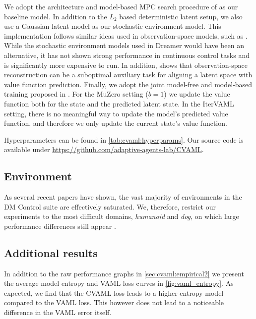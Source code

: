 We adopt the architecture and model-based MPC search procedure of \textcite{hansen2022temporal} as our baseline model.
In addition to the $L_2$ based deterministic latent setup, we also use a Gaussian latent model as our stochastic environment model.
This implementation follows similar ideas used in observation-space models, such as \textcite{pets,janner2019mbpo}.
While the stochastic environment models used in Dreamer \parencite{hafner2021mastering} would have been an alternative, it has not shown strong performance in continuous control tasks and is significantly more expensive to run.
In addition, \textcite{voelcker2024when} shows that observation-space reconstruction can be a suboptimal auxiliary task for aligning a latent space with value function prediction.
Finally, we adopt the joint model-free and model-based training proposed in \textcite{voelcker2025mad}.
For the MuZero setting ($b=1$) we update the value function both for the state and the predicted latent state.
In the IterVAML setting, there is no meaningful way to update the model's predicted value function, and therefore we only update the current state's value function.

Hyperparameters can be found in \autoref{tab:cvaml:hyperparams}.
Our source code is available under \url{https://github.com/adaptive-agents-lab/CVAML}.

\subsection{Environment}
\label{app:stoch_env}
As several recent papers have shown, the vast majority of environments in the DM Control suite are effectively saturated. 
We, therefore, restrict our experiments to the most difficult domains, \emph{humanoid} and \emph{dog}, on which large performance differences still appear \parencite{nauman2024bigger,voelcker2025mad,fujimoto2025towards}.


\subsection{Additional results}

In addition to the raw performance graphs in \autoref{sec:cvaml:empirical2} we present the average model entropy and VAML loss curves in \autoref{fig:vaml_entropy}.
As expected, we find that the CVAML loss leads to a higher entropy model compared to the VAML loss.
This however does not lead to a noticeable difference in the VAML error itself.

